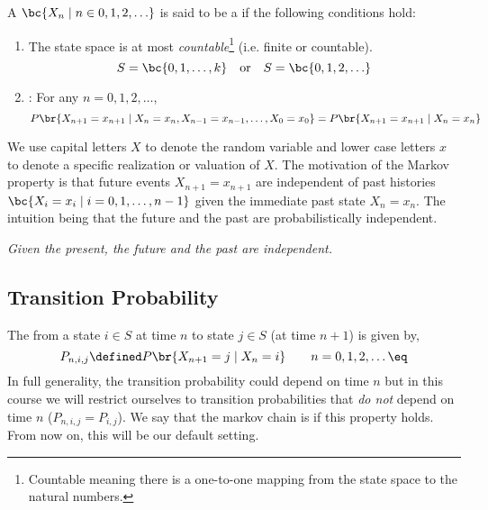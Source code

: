 \documentclass{article}
\begin{document}
A  $\bc{X_n \mid n \in 0, 1, 2, \ldots}$ is said to be a   if the following conditions hold:
\begin{enumerate}
    \item The state space is at most \textit{countable}\footnote{Countable meaning there is a one-to-one mapping from the state space to the natural numbers.} (i.e. finite or countable).
    \[ S = \bc{0, 1, \ldots, k} \quad \textrm{or} \quad S = \bc{0, 1, 2, \ldots} \]
    \item {}: For any $n = 0, 1, 2, \ldots$,
    \[ P\br{X_{n+1} = x_{n+1} \mid X_n = x_n, X_{n-1} = x_{n-1}, \ldots, X_{0} = x_{0}} = P\br{X_{n+1} = x_{n+1} \mid X_{n} = x_{n}} \]
\end{enumerate}
We use capital letters $X$ to denote the random variable and lower case letters $x$ to denote a specific realization or valuation of $X$. The motivation of the Markov property is that future events $X_{n+1} = x_{n+1}$ are independent of past histories $\bc{X_{i} = x_{i} \mid i = 0, 1, \ldots, n-1}$ given the immediate past state $X_{n} = x_{n}$. The intuition being that the future and the past are probabilistically independent.

\begin{center}
    \textit{Given the present, the future and the past are independent.}
\end{center}

\subsection{Transition Probability}

The  from a state $i \in S$ at time $n$ to state $j \in S$ (at time $n+1$) is given by,
\[ P_{n, i, j} \defined P \br{X_{n+1}= j \mid X_{n} = i} \qquad n = 0, 1, 2, \ldots \eq \label{eq:tranS_prob}\]
In full generality, the transition probability could depend on time $n$ but in this course we will restrict ourselves to transition probabilities that \textit{do not} depend on time $n$ ($P_{n, i, j} = P_{i, j}$). We say that the markov chain is  if this property holds. From now on, this will be our default setting. \\
\end{document}
